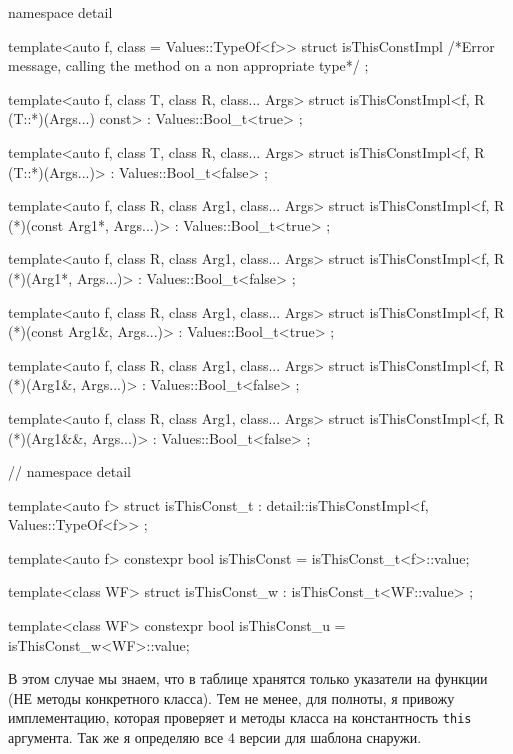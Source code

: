 \begin{cppcode}
namespace detail {
template<auto f, class = Values::TypeOf<f>>
struct isThisConstImpl {
  /*Error message, calling the method on a non appropriate type*/
};

template<auto f, class T, class R, class... Args>
struct isThisConstImpl<f, R (T::*)(Args...) const> : Values::Bool_t<true> {};

template<auto f, class T, class R, class... Args>
struct isThisConstImpl<f, R (T::*)(Args...)> : Values::Bool_t<false> {};

template<auto f, class R, class Arg1, class... Args>
struct isThisConstImpl<f, R (*)(const Arg1*, Args...)> : Values::Bool_t<true> {
};

template<auto f, class R, class Arg1, class... Args>
struct isThisConstImpl<f, R (*)(Arg1*, Args...)> : Values::Bool_t<false> {};

template<auto f, class R, class Arg1, class... Args>
struct isThisConstImpl<f, R (*)(const Arg1&, Args...)> : Values::Bool_t<true> {
};

template<auto f, class R, class Arg1, class... Args>
struct isThisConstImpl<f, R (*)(Arg1&, Args...)> : Values::Bool_t<false> {};

template<auto f, class R, class Arg1, class... Args>
struct isThisConstImpl<f, R (*)(Arg1&&, Args...)> : Values::Bool_t<false> {};
} // namespace detail 

template<auto f>
struct isThisConst_t : detail::isThisConstImpl<f, Values::TypeOf<f>> {};

template<auto f>
constexpr bool isThisConst = isThisConst_t<f>::value;

template<class WF>
struct isThisConst_w : isThisConst_t<WF::value> {};

template<class WF>
constexpr bool isThisConst_u = isThisConst_w<WF>::value;
\end{cppcode}
В этом случае мы знаем, что в таблице хранятся только указатели на функции (НЕ методы конкретного класса).
Тем не менее, для полноты, я привожу имплементацию, которая проверяет и методы класса на константность \verb"this" аргумента.
Так же я определяю все $4$ версии для шаблона снаружи.

